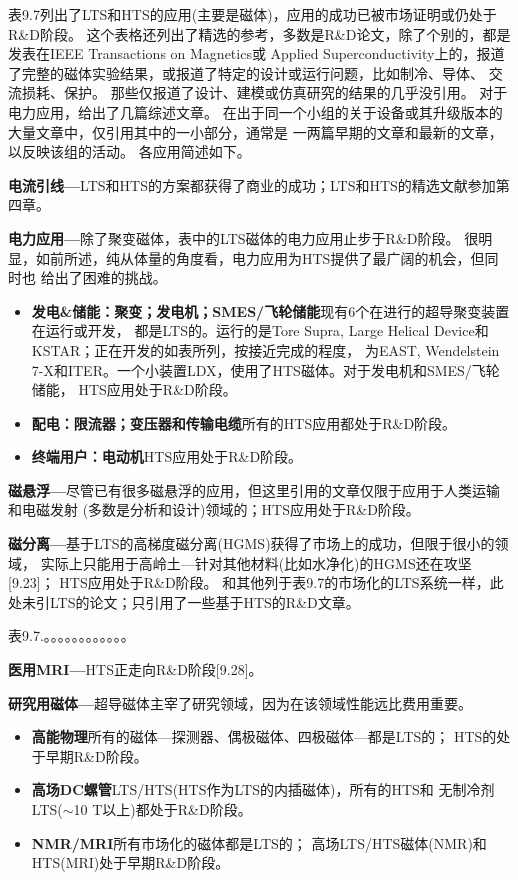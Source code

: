表9.7列出了LTS和HTS的应用(主要是磁体)，应用的成功已被市场证明或仍处于R\&D阶段。
这个表格还列出了精选的参考，多数是R\&D论文，除了个别的，都是发表在IEEE Transactions on Magnetics或
Applied Superconductivity上的，报道了完整的磁体实验结果，或报道了特定的设计或运行问题，比如制冷、导体、
交流损耗、保护。
那些仅报道了设计、建模或仿真研究的结果的几乎没引用。
对于电力应用，给出了几篇综述文章。
在出于同一个小组的关于设备或其升级版本的大量文章中，仅引用其中的一小部分，通常是
一两篇早期的文章和最新的文章，以反映该组的活动。
各应用简述如下。

\textbf{电流引线---}LTS和HTS的方案都获得了商业的成功；LTS和HTS的精选文献参加第四章。

\textbf{电力应用---}除了聚变磁体，表中的LTS磁体的电力应用止步于R\&D阶段。
很明显，如前所述，纯从体量的角度看，电力应用为HTS提供了最广阔的机会，但同时也
给出了困难的挑战。
\begin{itemize}
	\item \textbf{发电\&储能：聚变；发电机；SMES/飞轮储能}\qquad 现有6个在进行的超导聚变装置在运行或开发，
	都是LTS的。运行的是Tore Supra, Large Helical Device和KSTAR；正在开发的如表所列，按接近完成的程度，
	为EAST, Wendelstein 7-X和ITER。一个小装置LDX，使用了HTS磁体。对于发电机和SMES/飞轮储能，
	HTS应用处于R\&D阶段。
	\item  \textbf{配电：限流器；变压器和传输电缆}\qquad 所有的HTS应用都处于R\&D阶段。
	\item \textbf{终端用户：电动机}\qquad HTS应用处于R\&D阶段。
\end{itemize}

\textbf{磁悬浮---}尽管已有很多磁悬浮的应用，但这里引用的文章仅限于应用于人类运输和电磁发射
(多数是分析和设计)领域的；HTS应用处于R\&D阶段。

\textbf{磁分离---}基于LTS的高梯度磁分离(HGMS)获得了市场上的成功，但限于很小的领域，
实际上只能用于高岭土---针对其他材料(比如水净化)的HGMS还在攻坚[9.23]；
HTS应用处于R\&D阶段。
和其他列于表9.7的市场化的LTS系统一样，此处未引LTS的论文；只引用了一些基于HTS的R\&D文章。

表9.7.。。。。。。。。。。。。

\textbf{医用MRI---}HTS正走向R\&D阶段[9.28]。

\textbf{研究用磁体---}超导磁体主宰了研究领域，因为在该领域性能远比费用重要。
\begin{itemize}
	\item \textbf{高能物理}\qquad 所有的磁体---探测器、偶极磁体、四极磁体---都是LTS的；
	HTS的处于早期R\&D阶段。
	\item  \textbf{高场DC螺管}\qquad LTS/HTS(HTS作为LTS的内插磁体)，所有的HTS和
	无制冷剂LTS($\sim$10 T以上)都处于R\&D阶段。
	\item \textbf{NMR/MRI}\qquad 所有市场化的磁体都是LTS的；
	高场LTS/HTS磁体(NMR)和HTS(MRI)处于早期R\&D阶段。
\end{itemize}


